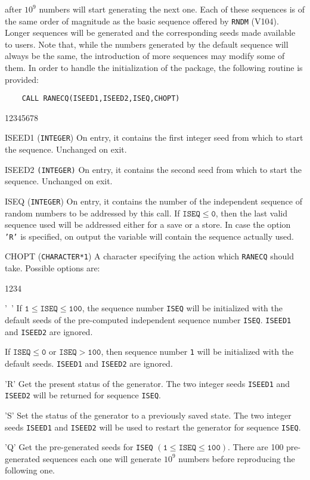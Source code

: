 after $ 10^9$ numbers will start generating the next one.
Each of these sequences is of the same order of magnitude as the
basic sequence offered by {\tt RNDM} (V104). Longer sequences
will be generated and the corresponding seeds made available
to users. Note that, while the numbers generated by the default
sequence will always be the same, the introduction of more sequences
may modify some of them. In order to handle the initialization
of the package, the following routine is provided:
\newpage
\begin{verbatim}
    CALL RANECQ(ISEED1,ISEED2,ISEQ,CHOPT)
\end{verbatim}
\begin{DLtt}{12345678}
\item [ISEED1] ({\tt INTEGER}) On entry, it contains the first integer
seed from which to start the sequence. Unchanged on exit.
\item [ISEED2] {\tt (INTEGER)} On entry, it contains the second seed
from which to start the sequence. Unchanged on exit.
\item [ISEQ] ({\tt INTEGER}) On entry, it contains the number of the
independent sequence of random numbers to be addressed by this call.
If $\mathtt{ISEQ \leq 0}$, then the last valid sequence
used will be addressed either for a save or a store. In case the
option {\tt 'R'} is specified, on output the variable will contain the
sequence actually used.
\item [CHOPT] ({\tt CHARACTER*1}) A character specifying the action
which {\tt RANECQ} should take. Possible options are:
\begin{DLtt}{1234}
\item ['\ '] If $\mathtt{1 \leq ISEQ \leq 100}$, the sequence
number {\tt ISEQ} will be initialized with the default seeds of the
pre-computed independent sequence number {\tt ISEQ}.
{\tt ISEED1} and {\tt ISEED2} are ignored.
\item[] If $\mathtt{ISEQ \leq 0}$ or $\mathtt{ISEQ > 100}$, then sequence
number {\tt 1} will be initialized with the default seeds.
{\tt ISEED1} and {\tt ISEED2} are ignored.
\item ['R'] Get the present status of the generator. The two integer
seeds {\tt ISEED1} and {\tt ISEED2} will be returned for sequence
{\tt ISEQ}.
\item ['S'] Set the status of the generator to a previously saved state.
The two integer seeds {\tt ISEED1} and {\tt ISEED2} will be used to
restart the generator for sequence {\tt ISEQ}.
\item ['Q'] Get the pre-generated seeds for {\tt ISEQ}
$(\mathtt{1 \leq ISEQ \leq 100})$. There are 100 pre-generated sequences
each one will generate $10^9$ numbers before reproducing the following
one.
\end{DLtt}
\end{DLtt}
